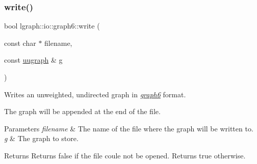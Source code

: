 \subsubsection{\texorpdfstring{write()}{write()}\hspace{0.1cm}{\footnotesize\ttfamily [2/2]}}
{\footnotesize\ttfamily bool lgraph\+::io\+::graph6\+::write (\begin{DoxyParamCaption}\item[{const char $\ast$}]{filename,  }\item[{const \hyperlink{classlgraph_1_1uugraph}{uugraph} \&}]{g }\end{DoxyParamCaption})}



Writes an unweighted, undirected graph in {\itshape \hyperlink{namespacelgraph_1_1io_1_1graph6}{graph6}} format. 

The graph will be appended at the end of the file. 
\begin{DoxyParams}{Parameters}
{\em filename} & The name of the file where the graph will be written to. \\
\hline
{\em g} & The graph to store. \\
\hline
\end{DoxyParams}
\begin{DoxyReturn}{Returns}
Returns false if the file coule not be opened. Returns true otherwise. 
\end{DoxyReturn}
